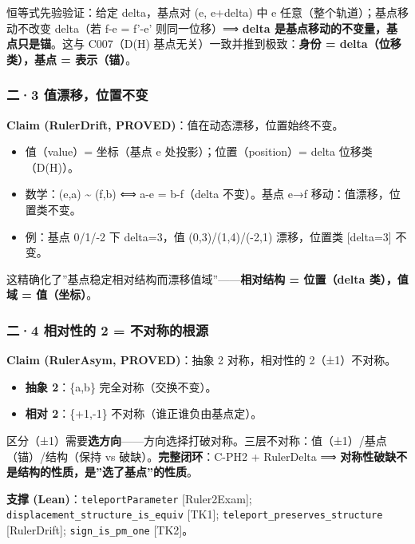 \documentclass[
]{article}
\providecommand{\tightlist}{%
  \setlength{\itemsep}{0pt}\setlength{\parskip}{0pt}}
\begin{document}
恒等式先验验证：给定 delta，基点对 (e, e+delta) 中 e
任意（整个轨道）；基点移动不改变 delta（若 f-e = f'-e' 则同一位移）⟹
\textbf{delta 是基点移动的不变量，基点只是锚}。这与 C007（D(H)
基点无关）一致并推到极致：\textbf{身份 = delta（位移类），基点 =
表示（锚）}。

\subsubsection{二·3
值漂移，位置不变}\label{ux4e8c3-ux503cux6f02ux79fbux4f4dux7f6eux4e0dux53d8}

\textbf{Claim (RulerDrift, PROVED)}：值在动态漂移，位置始终不变。

\begin{itemize}
\tightlist
\item
  值（value）= 坐标（基点 e 处投影）；位置（position）= delta
  位移类（D(H)）。
\item
  数学：(e,a) \textasciitilde{} (f,b) ⟺ a-e = b-f（delta 不变）。基点
  e→f 移动：值漂移，位置类不变。
\item
  例：基点 0/1/-2 下 delta=3，值 (0,3)/(1,4)/(-2,1) 漂移，位置类
  {[}delta=3{]} 不变。
\end{itemize}

这精确化了''基点稳定相对结构而漂移值域''------\textbf{相对结构 =
位置（delta 类），值域 = 值（坐标）}。

\subsubsection{二·4 相对性的 2 =
不对称的根源}\label{ux4e8c4-ux76f8ux5bf9ux6027ux7684-2-ux4e0dux5bf9ux79f0ux7684ux6839ux6e90}

\textbf{Claim (RulerAsym, PROVED)}：抽象 2 对称，相对性的
2（±1）不对称。

\begin{itemize}
\tightlist
\item
  \textbf{抽象 2}：\{a,b\} 完全对称（交换不变）。
\item
  \textbf{相对 2}：\{+1,-1\} 不对称（谁正谁负由基点定）。
\end{itemize}

区分（±1）需要\textbf{选方向}------方向选择打破对称。三层不对称：值（±1）/基点（锚）/结构（保持
vs 破缺）。\textbf{完整闭环}：C-PH2 + RulerDelta ⟹
\textbf{对称性破缺不是结构的性质，是''选了基点''的性质}。

\textbf{支撑 (Lean)}：\texttt{teleportParameter} {[}Ruler2Exam{]};
\texttt{displacement\_structure\_is\_equiv} {[}TK1{]};
\texttt{teleport\_preserves\_structure} {[}RulerDrift{]};
\texttt{sign\_is\_pm\_one} {[}TK2{]}。
\end{document}

